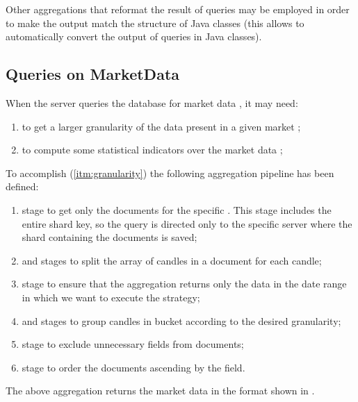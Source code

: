 Other aggregations that reformat the result of queries may be employed in order
to make the output match the structure of Java classes (this allows \mongodb{}
to automatically convert the output of queries in Java classes).

\subsection{Queries on MarketData}\label{subsec:marketdata-aggregations}

When the server queries the database for market data , it may need:
\begin{enumerate}
	\item\label{itm:granularity} to get a larger granularity of the data
		present in a given market ;
	\item\label{itm:indicators} to compute some statistical indicators over
		the market data ;
\end{enumerate}

To accomplish (\ref{itm:granularity}) the following aggregation pipeline has
been defined:
\begin{enumerate}
	\item {} stage to get only the documents for the specific
		. This stage includes the entire shard key, so the
		query is directed only to the specific server where the shard
		containing the documents is saved;
	\item {} and  stages to split the array
		of candles in a document for each candle;
	\item {} stage to ensure that the aggregation returns only
		the data in the date range in which we want to execute the
		strategy;
	\item {} and  stages to group candles in
		bucket according to the desired granularity;
	\item {} stage to exclude unnecessary fields from
		documents;
	\item {} stage to order the documents ascending by the
		 field.
\end{enumerate}

The above aggregation returns the market data in the format shown in
.


